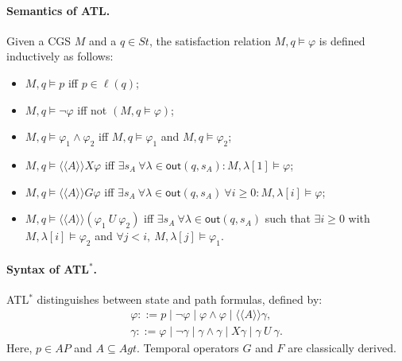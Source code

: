 \paragraph{Semantics of ATL.}
Given a CGS $M$ and a $q \in St$, the satisfaction relation $M,q \models \varphi$ is defined inductively as follows:
\begin{itemize}
  \item[-] $M,q \models p$ iff $p \in \ell(q)$;
  \item[-] $M,q \models \neg \varphi$ iff not $(M,q \models \varphi)$;
  \item[-] $M,q \models \varphi_1 \wedge \varphi_2$ iff
        $M,q \models \varphi_1$ and $M,q \models \varphi_2$;
  \item[-] $M,q \models \langle\!\langle A\rangle\!\rangle X \varphi$ iff
        $\exists s_A \ \forall \lambda \in \mathsf{out}(q,s_A):
        M,\lambda[1] \models \varphi$;
  \item[-] $M,q \models \langle\!\langle A\rangle\!\rangle G \varphi$ iff
        $\exists s_A \ \forall \lambda \in \mathsf{out}(q,s_A) \ \forall i \ge 0:
        M,\lambda[i] \models \varphi$;
  \item[-] $M,q \models \langle\!\langle A\rangle\!\rangle (\varphi_1 \ U \ \varphi_2)$ iff
        $\exists s_A \ \forall \lambda \in \mathsf{out}(q,s_A)$ such that
        $\exists i \ge 0$ with $M,\lambda[i] \models \varphi_2$ and
        $\forall j < i,\ M,\lambda[j] \models \varphi_1$.
\end{itemize}

\paragraph{Syntax of ATL$^\ast$.}
ATL$^\ast$  distinguishes between state and path formulas, defined by:
\[
\begin{array}{l}
\varphi ::= p \mid \neg \varphi \mid \varphi \wedge \varphi
\mid \langle\!\langle A\rangle\!\rangle \gamma, \\
\gamma ::= \varphi \mid \neg \gamma \mid \gamma \wedge \gamma
\mid X\gamma \mid \gamma \ U \ \gamma .
\end{array}
\]
Here, $p \in AP$ and $A \subseteq Agt$. Temporal operators $G$ and $F$ are classically derived.

